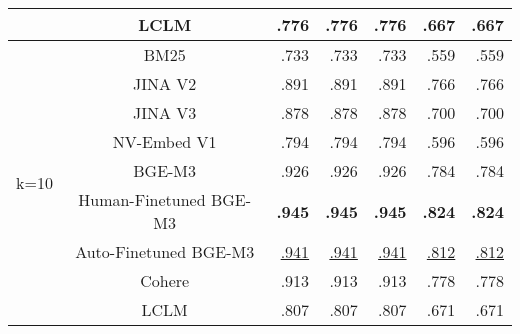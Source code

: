 \begin{table}[ht]
\begin{tabular}{@{}ccrrrrr@{}}
                      & LCLM                   & .776                    & .776                          & .776                        & .667                     & .667                           \\ \midrule
\multirow{9}{*}{k=10} & BM25                   & .733                    & .733                          & .733                        & .559                     & .559                           \\
                      & JINA V2                & .891                    & .891                          & .891                        & .766                     & .766                           \\
                      & JINA V3                & .878                    & .878                          & .878                        & .700                     & .700                           \\
                      & NV-Embed V1            & .794                    & .794                          & .794                        & .596                     & .596                           \\
                      & BGE-M3                 & .926                    & .926                          & .926                        & .784                     & .784                           \\
                      & Human-Finetuned BGE-M3 & \textbf{.945}           & \textbf{.945}                 & \textbf{.945}               & \textbf{.824}            & \textbf{.824}                  \\
                      & Auto-Finetuned BGE-M3  & \underline{ .941}              & \underline{ .941}                    & \underline{ .941}                  & \underline{ .812}               & \underline{ .812}                     \\
                      & Cohere                 & .913                    & .913                          & .913                        & .778                     & .778                           \\
                      & LCLM                   & .807                    & .807                          & .807                        & .671                     & .671                           \\ \bottomrule
\end{tabular}
\end{table}


